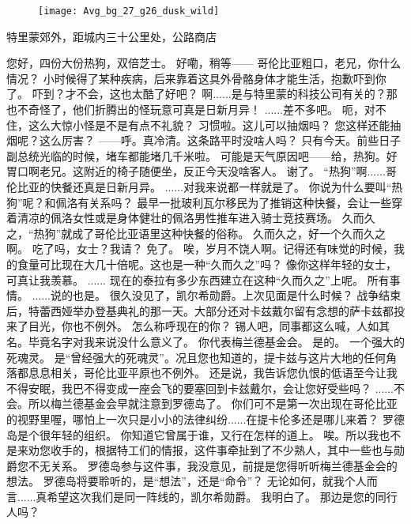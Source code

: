 \documentclass[openany]{book}
\begin{document}
\begin{figure}[h]
    \centering
    \texttt{[image: Avg\_bg\_27\_g26\_dusk\_wild]}
\end{figure}
特里蒙郊外，距城内三十公里处，公路商店\par
\begin{dialogue}
     您好，四份大份热狗，双倍芝士。
     好嘞，稍等——
     \*哥伦比亚粗口\*，老兄，你什么情况？
     小时候得了某种疾病，后来靠着这具外骨骼身体才能生活，抱歉吓到你了。
     吓到？才不会，这也太酷了好吧？
     啊......是与特里蒙的科技公司有关的？那也不奇怪了，他们折腾出的怪玩意可真是日新月异！
     ......差不多吧。
     呃，对不住，这么大惊小怪是不是有点不礼貌？
     习惯啦。这儿可以抽烟吗？
     您这样还能抽烟呢？这么厉害？
     ——呼。真冷清。这条路平时没啥人吗？
     只有今天。前些日子副总统光临的时候，堵车都能堵几千米啦。
     可能是天气原因吧——给，热狗。好胃口啊老兄。这附近的椅子随便坐，反正今天没啥客人。
     谢了。
     “热狗”啊......哥伦比亚的快餐还真是日新月异。
     ......对我来说都一样就是了。
     你说为什么要叫“热狗”呢？和佩洛有关系吗？
     最早一批玻利瓦尔移民为了推销这种快餐，会让一些穿着清凉的佩洛女性或是身体健壮的佩洛男性推车进入骑士竞技赛场。
     久而久之，“热狗”就成了哥伦比亚语里这种快餐的俗称。
     久而久之，好一个久而久之啊。
     吃了吗，女士？我请？
     免了。
     唉，岁月不饶人啊。记得还有味觉的时候，我的食量可比现在大几十倍呢。这也是一种“久而久之”吗？
     像你这样年轻的女士，可真让我羡慕。
     ......
     现在的泰拉有多少东西建立在这种“久而久之”上呢。
     所有事情。
     ......说的也是。
     很久没见了，凯尔希勋爵。上次见面是什么时候？
     战争结束后，特蕾西娅举办登基典礼的那一天。大部分还对卡兹戴尔留有念想的萨卡兹都投来了目光，你也不例外。
     怎么称呼现在的你？
     锡人吧，同事都这么喊，人如其名。毕竟名字对我来说没什么意义了。
     你代表梅兰德基金会。
     是的。
     一个强大的死魂灵。
     是“曾经强大的死魂灵”。况且您也知道的，提卡兹与这片大地的任何角落都息息相关，哥伦比亚平原也不例外。
     还是说，我告诉您仇恨的低语至今让我不得安眠，我巴不得变成一座会飞的要塞回到卡兹戴尔，会让您好受些吗？
     ......不会。所以梅兰德基金会早就注意到罗德岛了。
     你们可不是第一次出现在哥伦比亚的视野里喔，哪怕上一次只是小小的法律纠纷......在提卡伦多还是哪儿来着？
     罗德岛是个很年轻的组织。
     你知道它曾属于谁，又行在怎样的道上。
     唉。所以我也不是来劝您收手的，根据特工们的情报，这件事牵扯到了不少熟人，其中一些也与勋爵您不无关系。
     罗德岛参与这件事，我没意见，前提是您得听听梅兰德基金会的想法。
     罗德岛将要聆听的，是“想法”，还是“命令”？
     无论如何，就我个人而言......真希望这次我们是同一阵线的，凯尔希勋爵。
     我明白了。
     那边是您的同行人吗？
\end{dialogue}
\end{document}
